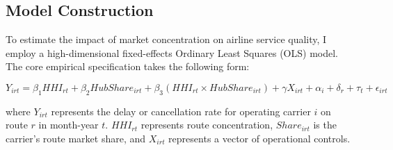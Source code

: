 \documentclass[preprint,12pt,authoryear]{elsarticle}
\begin{document}
\begin{table}[htbp]
\centering
\caption{Key Variables Summary Statistics of the Full Sample ($N = 667,836$)}
\label{tab:summary_stats}
\small %
\end{table}

\FloatBarrier

\subsection{Model Construction}
To estimate the impact of market concentration on airline service quality, I employ a high-dimensional fixed-effects Ordinary Least Squares (OLS) model. The core empirical specification takes the following form:

\begin{equation}
    Y_{irt} = \beta_1 HHI_{rt} + \beta_2 HubShare_{irt} + \beta_3 (HHI_{rt} \times HubShare_{irt}) + \gamma X_{irt} + \alpha_i + \delta_r + \tau_t + \epsilon_{irt}
\end{equation}

where $Y_{irt}$ represents the delay or cancellation rate for operating carrier $i$ on route $r$ in month-year $t$. $HHI_{rt}$ represents route concentration, $Share_{irt}$ is the carrier's route market share, and $X_{irt}$ represents a vector of operational controls.
\end{document}
